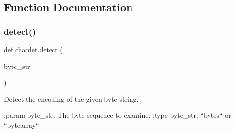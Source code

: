 \subsection{Function Documentation}
\mbox{\label{namespacechardet_a5d13c09e4d402035d14177de42e5422d}} 
\subsubsection{\texorpdfstring{detect()}{detect()}}
{\footnotesize\ttfamily def chardet.\+detect (\begin{DoxyParamCaption}\item[{}]{byte\+\_\+str }\end{DoxyParamCaption})}

\begin{DoxyVerb}Detect the encoding of the given byte string.

:param byte_str:     The byte sequence to examine.
:type byte_str:      ``bytes`` or ``bytearray``
\end{DoxyVerb}
 